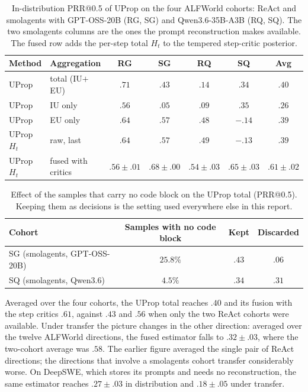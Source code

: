 \begin{table}[ht]
\centering
\small
\begin{tabular}{llccccc}
\toprule
\textbf{Method} & \textbf{Aggregation} & RG & SG & RQ & SQ & Avg \\
\midrule
UProp & total (IU${+}$EU) & $.71$ & $.43$ & $.14$ & $.34$ & $.40$ \\
UProp & IU only & $.56$ & $.05$ & $.09$ & $.35$ & $.26$ \\
UProp & EU only & $.64$ & $.57$ & $.48$ & $-.14$ & $.39$ \\
UProp $H_t$ & raw, last & $.64$ & $.57$ & $.49$ & $-.13$ & $.39$ \\
UProp $H_t$ & fused with critics & $.56{\pm}.01$ & $.68{\pm}.00$ & $.54{\pm}.03$ & $.65{\pm}.03$ & $\mathbf{.61{\pm}.02}$ \\
\bottomrule
\end{tabular}
\caption{In-distribution PRR@0.5 of UProp on the four ALFWorld cohorts: ReAct and smolagents with
GPT-OSS-20B (RG, SG) and Qwen3.6-35B-A3B (RQ, SQ). The two smolagents columns are the ones the
prompt reconstruction makes available. The fused row adds the per-step total $H_t$ to the tempered
step-critic posterior.}
\label{tab:uprop-smol-cohorts}
\end{table}

\begin{table}[ht]
\centering
\small
\begin{tabular}{lccc}
\toprule
\textbf{Cohort} & \textbf{Samples with no code block} & \textbf{Kept} & \textbf{Discarded} \\
\midrule
SG (smolagents, GPT-OSS-20B) & $25.8\%$ & $.43$ & $.06$ \\
SQ (smolagents, Qwen3.6) & $4.5\%$ & $.34$ & $.31$ \\
\bottomrule
\end{tabular}
\caption{Effect of the samples that carry no code block on the UProp total (PRR@0.5). Keeping them
as decisions is the setting used everywhere else in this report.}
\label{tab:uprop-smol-sensitivity}
\end{table}

Averaged over the four cohorts, the UProp total reaches $.40$ and its fusion with the step critics
$.61$, against $.43$ and $.56$ when only the two ReAct cohorts were available. Under transfer the
picture changes in the other direction: averaged over the twelve ALFWorld directions, the fused
estimator falls to $.32{\pm}.03$, where the two-cohort average was $.58$. The earlier figure
averaged the single pair of ReAct directions; the directions that involve a smolagents cohort
transfer considerably worse. On DeepSWE, which stores its prompts and needs no reconstruction, the
same estimator reaches $.27{\pm}.03$ in distribution and $.18{\pm}.05$ under transfer.
